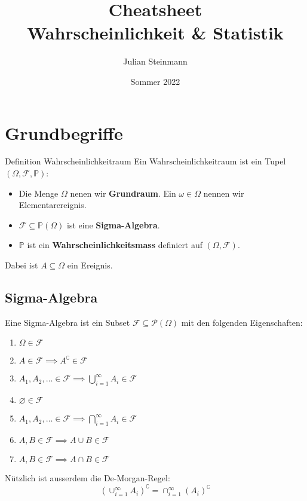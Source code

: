 \documentclass[a4paper,10pt]{article}
\title{Cheatsheet\\ Wahrscheinlichkeit \& Statistik}
\author{Julian Steinmann}
\date{Sommer 2022}
\def\P{\mathbb{P}}
\def\F{\mathcal{F}}
\begin{document}
\maketitle



\section{Grundbegriffe}
\begin{subbox}{Definition Wahrscheinlichkeitraum}
	Ein Wahrscheinlichkeitraum ist ein Tupel \((\Omega, \F, \P)\):
	\begin{itemize}
		\item Die Menge \(\Omega\) nenen wir \textbf{Grundraum}. Ein \(\omega \in \Omega\) nennen wir Elementarereignis.
		\item \(\F \subseteq \P(\Omega)\) ist eine \textbf{Sigma-Algebra}.
		\item \(\P\) ist ein \textbf{Wahrscheinlichkeitsmass} definiert auf \((\Omega, \F)\).
	\end{itemize}
	Dabei ist \(A \subseteq \Omega\) ein Ereignis.
\end{subbox}

\subsection{Sigma-Algebra}
Eine Sigma-Algebra ist ein Subset \(\F \subseteq \mathcal{P}(\Omega)\) mit den folgenden Eigenschaften:
\begin{enumerate}
	\item \(\Omega \in \F\)
	\item \(A \in \F \implies A^\complement \in \F\)
	\item \(A_1, A_2, \ldots \in \F \implies \bigcup_{i=1}^\infty A_i \in \F\)
	\item \(\varnothing \in \F\)
	\item \(A_1, A_2, \ldots \in \F \implies \bigcap_{i=1}^\infty A_i \in \F\)
	\item \(A, B \in \F \implies A \cup B \in \F\)
	\item \(A, B \in \F \implies A \cap B \in \F\)
\end{enumerate}
Nützlich ist ausserdem die De-Morgan-Regel: \[(\cup_{i=1}^\infty A_i)^\complement = \cap_{i=1}^\infty(A_i)^\complement\]
\end{document}
